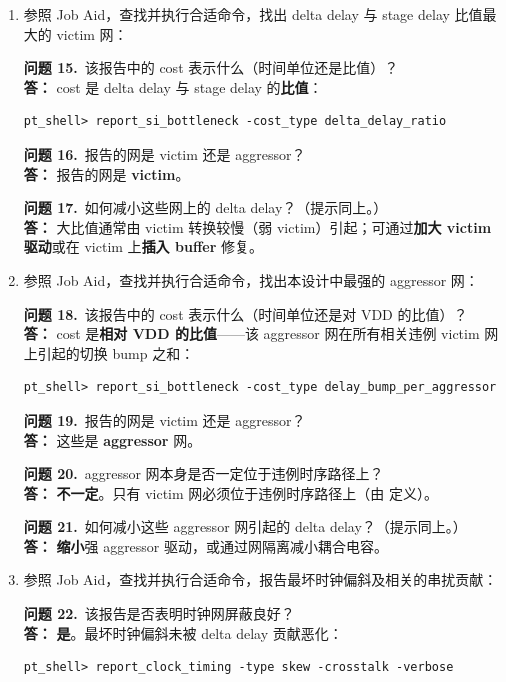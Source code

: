 \begin{enumerate}
  \item 参照 Job Aid，查找并执行合适命令，找出 delta delay 与 stage delay 比值最大的 victim 网：
\begin{questionBox}
\textbf{问题 15.}\ 该报告中的 cost 表示什么（时间单位还是比值）？\\[0.35em]
\textbf{答：} cost 是 delta delay 与 stage delay 的\textbf{比值}：
\begin{lstlisting}
pt_shell> report_si_bottleneck -cost_type delta_delay_ratio
\end{lstlisting}

\textbf{问题 16.}\ 报告的网是 victim 还是 aggressor？\\[0.35em]
\textbf{答：} 报告的网是 \textbf{victim}。

\textbf{问题 17.}\ 如何减小这些网上的 delta delay？（提示同上。）\\[0.35em]
\textbf{答：} 大比值通常由 victim 转换较慢（弱 victim）引起；可通过\textbf{加大 victim 驱动}或在 victim 上\textbf{插入 buffer} 修复。
\end{questionBox}

  \item 参照 Job Aid，查找并执行合适命令，找出本设计中最强的 aggressor 网：
\begin{questionBox}
\textbf{问题 18.}\ 该报告中的 cost 表示什么（时间单位还是对 VDD 的比值）？\\[0.35em]
\textbf{答：} cost 是\textbf{相对 VDD 的比值}——该 aggressor 网在所有相关违例 victim 网上引起的切换 bump 之和：
\begin{lstlisting}
pt_shell> report_si_bottleneck -cost_type delay_bump_per_aggressor
\end{lstlisting}

\textbf{问题 19.}\ 报告的网是 victim 还是 aggressor？\\[0.35em]
\textbf{答：} 这些是 \textbf{aggressor} 网。

\textbf{问题 20.}\ aggressor 网本身是否一定位于违例时序路径上？\\[0.35em]
\textbf{答：} \textbf{不一定}。只有 victim 网必须位于违例时序路径上（由  定义）。

\textbf{问题 21.}\ 如何减小这些 aggressor 网引起的 delta delay？（提示同上。）\\[0.35em]
\textbf{答：} \textbf{缩小}强 aggressor 驱动，或通过网隔离减小耦合电容。
\end{questionBox}

  \item 参照 Job Aid，查找并执行合适命令，报告最坏时钟偏斜及相关的串扰贡献：
\begin{questionBox}
\textbf{问题 22.}\ 该报告是否表明时钟网屏蔽良好？\\[0.35em]
\textbf{答：} \textbf{是}。最坏时钟偏斜未被 delta delay 贡献恶化：
\begin{lstlisting}
pt_shell> report_clock_timing -type skew -crosstalk -verbose
\end{lstlisting}
\end{questionBox}
\end{enumerate}

